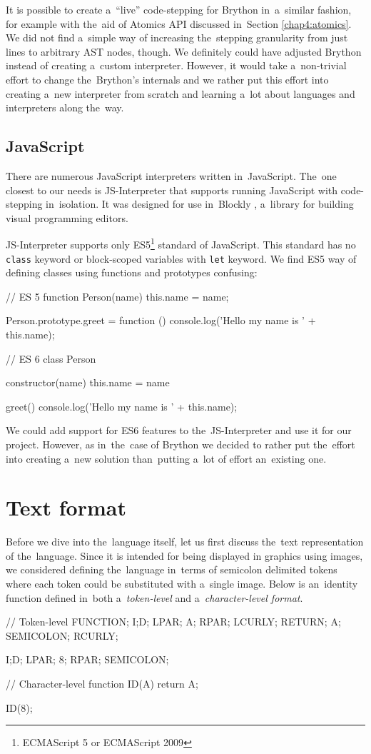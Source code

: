 It is possible to create a~``live'' code-stepping for Brython in~a~similar fashion, for example with the~aid of Atomics API discussed in~Section \ref{chap4:atomics}.
We did not find a~simple way of increasing the~stepping granularity from just lines to arbitrary AST nodes, though. We definitely could have adjusted Brython instead
of creating a~custom interpreter. However, it would take a~non-trivial effort to change the~Brython's internals and we rather put this effort into creating
a~new interpreter from scratch and learning a~lot about languages and interpreters along the~way.

\subsection{JavaScript}
\label{chap3:javascript}
There are numerous JavaScript interpreters written in~JavaScript. The~one closest to our needs is JS-Interpreter \cite{JSInterpreter} that supports running JavaScript
with code-stepping in~isolation. It was designed for use in~Blockly \cite{Blockly}, a~library for building visual programming editors.

JS-Interpreter supports only ES5\footnote{ECMAScript 5 or ECMAScript 2009} standard of JavaScript. This standard has no \texttt{class} keyword or block-scoped
variables with \texttt{let} keyword. We find ES5 way of defining classes using functions and prototypes confusing:
\begin{code}
// ES 5
function Person(name) {
    this.name = name;  
}

Person.prototype.greet = function () {
    console.log('Hello my name is ' + this.name);
}

// ES 6
class Person {
    constructor(name) {
        this.name = name
    }

    greet() {
        console.log('Hello my name is ' + this.name);
    }
}
\end{code}

We could add support for ES6 features to the~JS-Interpreter and use it for our project. However, as in~the~case of Brython we decided to rather put the~effort into
creating a~new solution than~putting a~lot of effort an~existing one.

\section{Text format}
Before we dive into the~language itself, let us first discuss the~text representation of the~language. Since it is intended for being displayed in
graphics using images, we considered defining the~language in~terms of semicolon delimited tokens where each token could be substituted with a~single image.
Below is an~identity function defined in~both a~\emph{token-level} and a~\emph{character-level format}.
\begin{code}
// Token-level
FUNCTION; I;D; LPAR; A; RPAR; LCURLY;
RETURN; A; SEMICOLON;
RCURLY;

I;D; LPAR; 8; RPAR; SEMICOLON;

// Character-level
function ID(A) {
    return A;
}

ID(8);
\end{code}

